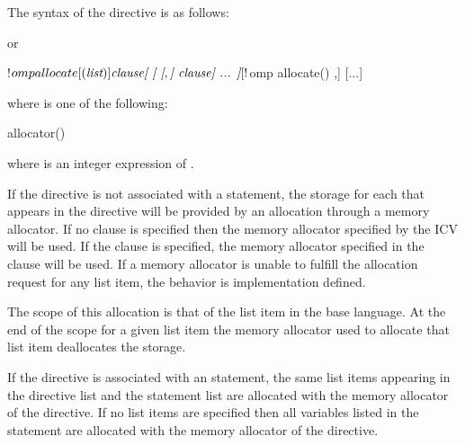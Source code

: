 \begin{fortranspecific}
The syntax of the  directive is as follows:


or
\begin{ompfPragma}
!$omp allocate[()] \plc{clause[ [ [},\plc{] clause] ... ]}
[!$omp allocate() \plc{clause[ [ [},\plc{] clause] ... ]}]
[...]
\end{ompfPragma}

where  is one of the following:

\begin{indentedcodelist}
allocator()
\end{indentedcodelist}

where  is an integer expression of  .

\end{fortranspecific}

\descr

If the directive is not associated with a statement, the storage for each  that appears in the directive will be provided by an allocation through a memory allocator. If no clause is specified then the memory allocator specified by the  ICV will be used. If the  clause is specified, the memory allocator specified in the clause will be used. If a memory allocator is unable to fulfill the allocation request for any list item, the behavior is implementation defined.

The scope of this allocation is that of the list item in the base language. At the end of the scope for a given list item the memory allocator used to allocate that list item deallocates the storage.

\begin{fortranspecific}
If the directive is associated with an  statement, the same list items appearing in the directive list and the  statement list are allocated with the memory allocator of the directive.
If no list items are specified then all variables listed in the  statement are allocated with the memory allocator of the directive.
\end{fortranspecific}

